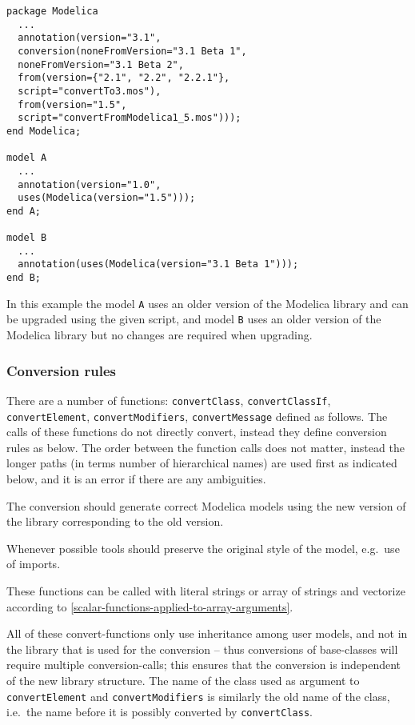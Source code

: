 \begin{example}
\begin{lstlisting}[language=modelica]
package Modelica
  ...
  annotation(version="3.1",
  conversion(noneFromVersion="3.1 Beta 1",
  noneFromVersion="3.1 Beta 2",
  from(version={"2.1", "2.2", "2.2.1"},
  script="convertTo3.mos"),
  from(version="1.5",
  script="convertFromModelica1_5.mos")));
end Modelica;

model A
  ...
  annotation(version="1.0",
  uses(Modelica(version="1.5")));
end A;

model B
  ...
  annotation(uses(Modelica(version="3.1 Beta 1")));
end B;
\end{lstlisting}
In this example the model \lstinline!A! uses an older version of the
Modelica library and can be upgraded using the given script, and model
\lstinline!B! uses an older version of the Modelica library but no changes are
required when upgrading.
\end{example}

\subsubsection{Conversion rules}\label{conversion-rules}

There are a number of functions: \lstinline!convertClass!, \lstinline!convertClassIf!,
\lstinline!convertElement!, \mbox{\lstinline!convertModifiers!,} \lstinline!convertMessage! defined as follows. The
calls of these functions do not directly convert, instead they define
conversion rules as below. The order between the function calls does not
matter, instead the longer paths (in terms number of hierarchical names)
are used first as indicated below, and it is an error if there are any
ambiguities.

The conversion should generate correct Modelica models using the new version of the library
corresponding to the old version.

\begin{nonnormative}
Whenever possible tools should preserve the original style of the model, e.g.\ use of imports.
\end{nonnormative}

These functions can be called with literal strings or array of strings
and vectorize according to \cref{scalar-functions-applied-to-array-arguments}.

All of these convert-functions only use inheritance among user
models, and not in the library that is used for the conversion -- thus
conversions of base-classes will require multiple conversion-calls; this
ensures that the conversion is independent of the new library structure.
The name of the class used as argument to \lstinline!convertElement! and \lstinline!convertModifiers!
is similarly the old name of the class, i.e.\ the name before it is
possibly converted by \lstinline!convertClass!.

